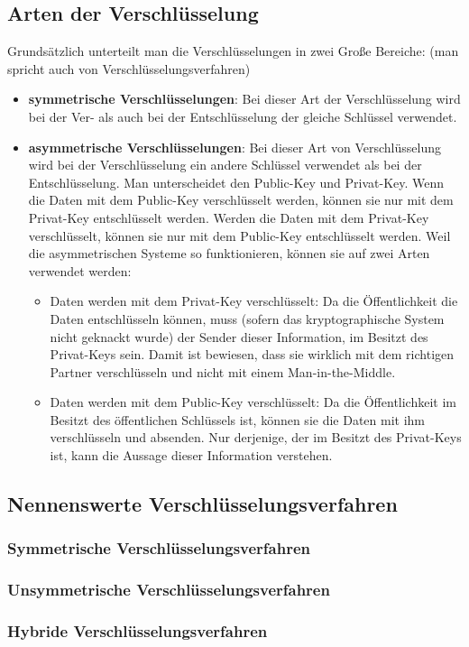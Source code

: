 \subsection{Arten der Verschlüsselung}

Grundsätzlich unterteilt man die Verschlüsselungen in zwei Große Bereiche: (man spricht auch von Verschlüsselungsverfahren)

\begin{itemize}
\item \textbf{symmetrische Verschlüsselungen}: Bei dieser Art der Verschlüsselung wird bei der Ver- als auch bei der Entschlüsselung der gleiche Schlüssel verwendet.
\item \textbf{asymmetrische Verschlüsselungen}: Bei dieser Art von Verschlüsselung wird bei der Verschlüsselung ein andere Schlüssel verwendet als bei der Entschlüsselung. Man unterscheidet den Public-Key und Privat-Key. Wenn die Daten mit dem Public-Key verschlüsselt werden, können sie nur mit dem Privat-Key entschlüsselt werden. Werden die Daten mit dem Privat-Key verschlüsselt, können sie nur mit dem Public-Key entschlüsselt werden. Weil die asymmetrischen Systeme so funktionieren, können sie auf zwei Arten verwendet werden:

  \begin{itemize}
	\item Daten werden mit dem Privat-Key verschlüsselt: Da die Öffentlichkeit die Daten entschlüsseln können, muss (sofern das kryptographische System nicht geknackt wurde) der Sender dieser Information, im Besitzt des Privat-Keys sein. Damit ist bewiesen, dass sie wirklich mit dem richtigen Partner verschlüsseln und nicht mit einem Man-in-the-Middle.
	\item Daten werden mit dem Public-Key verschlüsselt: Da die Öffentlichkeit im Besitzt des öffentlichen Schlüssels ist, können sie die Daten mit ihm verschlüsseln und absenden. Nur derjenige, der im Besitzt des Privat-Keys ist, kann die Aussage dieser Information verstehen.
  \end{itemize}
  
\end{itemize}

\subsection{Nennenswerte Verschlüsselungsverfahren}

\subsubsection{Symmetrische Verschlüsselungsverfahren}

\subsubsection{Unsymmetrische Verschlüsselungsverfahren}

\subsubsection{Hybride Verschlüsselungsverfahren}
